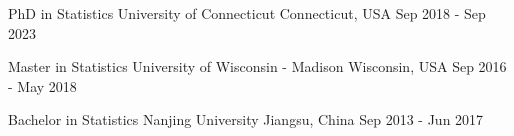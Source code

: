 

\begin{cventries}

  \cventry
    {PhD in Statistics} %
    {University of Connecticut} %
    {Connecticut, USA} %
    {Sep 2018 - Sep 2023} %
    {}

    \cventry
    {Master in Statistics} %
    {University of Wisconsin - Madison} %
    {Wisconsin, USA} %
    {Sep 2016 - May 2018} %
    {}

    \cventry
    {Bachelor in Statistics} %
    {Nanjing University} %
    {Jiangsu, China} %
    {Sep 2013 - Jun 2017} %
    {}

\end{cventries}
